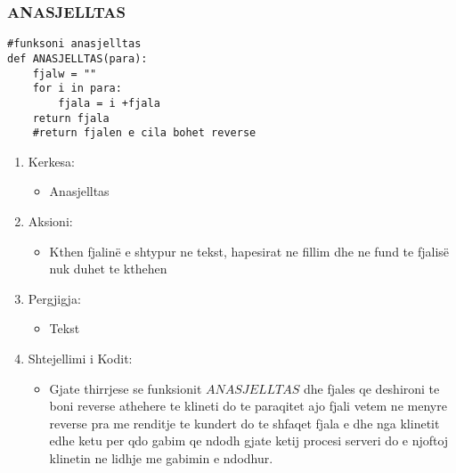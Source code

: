 \documentclass[]{article}
\begin{document}
\subsubsection{ANASJELLTAS}
\begin{lstlisting}
#funksoni anasjelltas
def ANASJELLTAS(para):
    fjalw = "" 
    for i in para:
        fjala = i +fjala
    return fjala
    #return fjalen e cila bohet reverse
\end{lstlisting}
\begin{enumerate}
\item Kerkesa:
\begin{itemize}
\item Anasjelltas
\end{itemize}
\item Aksioni:
\begin{itemize}
\item Kthen fjalinë e shtypur ne tekst, hapesirat ne fillim dhe ne fund te fjalisë nuk duhet te kthehen
\end{itemize}
\item Pergjigja:
\begin{itemize}
\item Tekst
\end{itemize}

\item Shtejellimi i Kodit:
\begin{itemize}
\item Gjate thirrjese se funksionit $ANASJELLTAS$ dhe fjales qe deshironi te boni reverse athehere te klineti do te paraqitet ajo fjali vetem ne menyre reverse pra me renditje te kundert do te shfaqet fjala e dhe nga  klinetit edhe ketu per qdo gabim qe ndodh gjate ketij procesi serveri do e njoftoj klinetin ne lidhje me gabimin e ndodhur.
\end{itemize}
\end{enumerate}
\newpage
\end{document}
